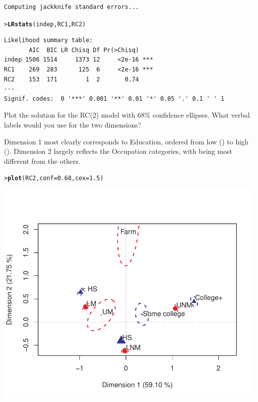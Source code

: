 \documentclass[10pt]{report}\usepackage[]{graphicx}\usepackage[]{color}
\makeatletter
\newcommand{\hlnum}[1]{\textcolor[rgb]{0.686,0.059,0.569}{#1}}%
\newcommand{\hlstd}[1]{\textcolor[rgb]{0.345,0.345,0.345}{#1}}%
\newcommand{\hlkwc}[1]{\textcolor[rgb]{0.333,0.667,0.333}{#1}}%
\newcommand{\hlkwd}[1]{\textcolor[rgb]{0.737,0.353,0.396}{\textbf{#1}}}%
\newenvironment{kframe}{%
 \def\at@end@of@kframe{}%
 \ifinner\ifhmode%
  \def\at@end@of@kframe{\end{minipage}}%
  \begin{minipage}{\columnwidth}%
 \fi\fi%
 \def\FrameCommand##1{\hskip\@totalleftmargin \hskip-\fboxsep
 \colorbox{shadecolor}{##1}\hskip-\fboxsep
     \hskip-\linewidth \hskip-\@totalleftmargin \hskip\columnwidth}%
 \MakeFramed {\advance\hsize-\width
   \@totalleftmargin\z@ \linewidth\hsize
   \@setminipage}}%
 {\par\unskip\endMakeFramed%
 \at@end@of@kframe}
\newenvironment{knitrout}{}{} %
\renewenvironment{knitrout}{\small\renewcommand{\baselinestretch}{.85}}{} %
\makeatother
\begin{document}
\begin{Exercises}
\begin{enumerate*}
\begin{ans}
\begin{knitrout}
\begin{kframe}
\begin{alltt}
\end{alltt}
\begin{verbatim}
Computing jackknife standard errors...
\end{verbatim}
\begin{alltt}
\hlstd{> }\hlkwd{LRstats}\hlstd{(indep, RC1, RC2)}
\end{alltt}
\begin{verbatim}
Likelihood summary table:
       AIC  BIC LR Chisq Df Pr(>Chisq)    
indep 1506 1514     1373 12     <2e-16 ***
RC1    269  283      125  6     <2e-16 ***
RC2    153  171        1  2       0.74    
---
Signif. codes:  0 '***' 0.001 '**' 0.01 '*' 0.05 '.' 0.1 ' ' 1
\end{verbatim}
\end{kframe}
\end{knitrout}
    \end{ans}
    
    \item Plot the solution for the RC(2) model with 68\% confidence ellipses.
    What verbal labels would you use for the two dimensions?
    \begin{ans}
    Dimension 1 most clearly corresponds to Education, ordered from low () to high ().
    Dimension 2 largely reflects the Occupation categories, with  being most different from the others.
\begin{knitrout}\footnotesize
{}\color{fgcolor}\begin{kframe}
\begin{alltt}
\hlstd{> }\hlkwd{plot}\hlstd{(RC2,} \hlkwc{conf}\hlstd{=}\hlnum{0.68}\hlstd{,} \hlkwc{cex}\hlstd{=}\hlnum{1.5}\hlstd{)}
\end{alltt}
\end{kframe}

\centerline{\includegraphics[width=.5\textwidth]{soln/fig/ex10_4b-1} }




\end{knitrout}
\end{ans}
\end{enumerate*}
\end{Exercises}
\end{document}
